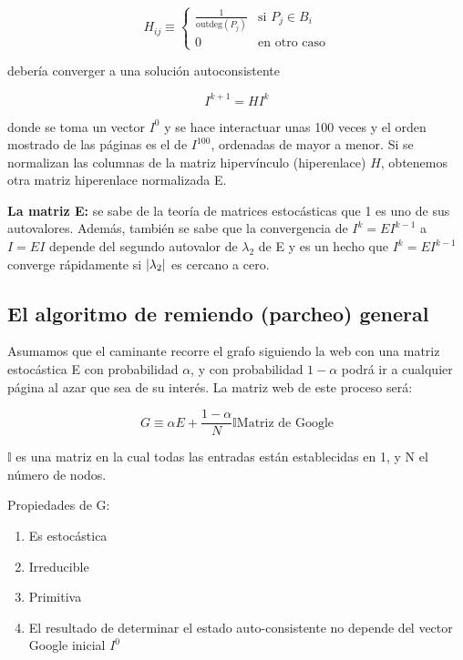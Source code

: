 \documentclass[11pt, spanish]{report}
\begin{document}
\[
H_{ij} \equiv \begin{cases}
\frac{1}{\mathrm{outdeg}(P_j)} & \text{si } P_j \in B_i \\
0 & \text{en otro caso}
\end{cases}
\]

debería converger a una solución autoconsistente

\[
I^{k+1} = H I^k
\]

donde se toma un vector $I^{0}$ y se hace interactuar unas 100 veces y el orden mostrado de las páginas es el de $I^{100}$, ordenadas de mayor a menor. Si se normalizan las columnas de la matriz hipervínculo (hiperenlace) $H$, obtenemos otra matriz hiperenlace normalizada E.

\textbf{La matriz E:} se sabe de la teoría de matrices estocásticas que 1 es uno de sus autovalores. Además, también se sabe que la convergencia de $I^k = E I^{k-1}$ a $I = E I$ depende del segundo autovalor de $\lambda_2$ de E y es un hecho que $I^k = E I^{k-1}$ converge rápidamente si $\abs{\lambda_2}$ es
cercano a cero.

\subsection{El algoritmo de remiendo (parcheo) general}

Asumamos que el caminante recorre el grafo siguiendo la web con una matriz estocástica E con probabilidad $\alpha$, y con probabilidad $1-\alpha$ podrá ir a cualquier página al azar que sea de su interés. La matriz web de este proceso será:

\[
G \equiv \alpha E + \frac{1-\alpha}{N} \mathds{I} \text{Matriz de Google}
\]

$\mathds{I}$ es una matriz en la cual todas las entradas están establecidas en 1, y N el número de nodos.

Propiedades de G:
\begin{enumerate}
\item Es estocástica
\item Irreducible
\item Primitiva
\item El resultado de determinar el estado auto-consistente no depende del vector Google inicial $I^0$
\end{enumerate}
\end{document}
